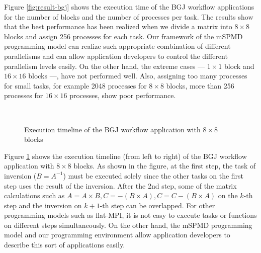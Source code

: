 \documentclass[graybox]{svmult}
\begin{document}
Figure \ref{fig:result-bgj} shows the execution time of the BGJ workflow applications for the number of blocks and the number of  processes per task. 
The results show that the best performance has been realized when we divide a matrix into $8 \times 8$ blocks and assign 256 processes for each task. 
Our framework of the mSPMD programming model can realize such appropriate combination of different parallelisms and can allow application developers to control the different parallelism levels easily. 
On the other hand, the extreme cases --- $1 \times 1$ block and $16 \times 16$ blocks ---, have not performed well. Also, assigning too many processes for small tasks, for example 2048 processes for $8 \times 8$ blocks, more than 256 processes for $16 \times 16$ processes, show poor performance. 


\begin{figure}[t]
 \begin{center}
 \end{center}
 \caption{Execution timeline of the BGJ workflow application with $8\times 8$ blocks}
\label{fig:timeline}\
\end{figure}

Figure \ref{fig:timeline} shows the execution timeline (from left to right) of the BGJ workflow application with $8\times 8$ blocks. As shown in the figure, at the first step, the task of inversion ($B=A^{-1}$) must be executed solely since the other tasks on the first step uses the result of the inversion. After the 2nd step, some of the matrix calculations such as $A=A\times B, C=-(B\times A), C=C-(B\times A)$ on the $k$-th step and the inversion on $k+1$-th step can be overlapped. For other programming models such as flat-MPI, it is not easy to execute tasks or functions on different steps simultaneously. On the other hand, the mSPMD programming model and our programming environment allow application developers to describe this sort of applications easily. 
\end{document}
